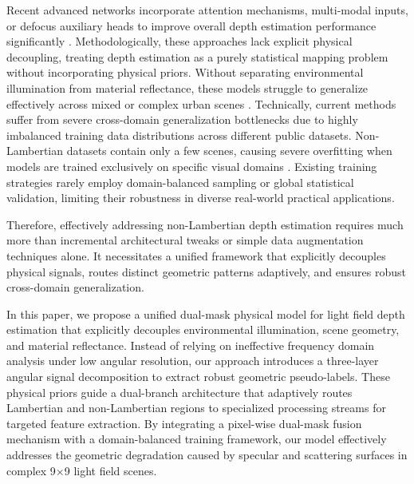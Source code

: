 \documentclass[lettersize,journal]{IEEEtran}
\begin{document}
Recent advanced networks incorporate attention mechanisms, multi-modal inputs, or defocus auxiliary heads to improve overall depth estimation performance significantly \cite{attentionatten}. Methodologically, these approaches lack explicit physical decoupling, treating depth estimation as a purely statistical mapping problem without incorporating physical priors. Without separating environmental illumination from material reflectance, these models struggle to generalize effectively across mixed or complex urban scenes \cite{mixedmixed}. Technically, current methods suffer from severe cross-domain generalization bottlenecks due to highly imbalanced training data distributions across different public datasets. Non-Lambertian datasets contain only a few scenes, causing severe overfitting when models are trained exclusively on specific visual domains \cite{datadata}. Existing training strategies rarely employ domain-balanced sampling or global statistical validation, limiting their robustness in diverse real-world practical applications.

Therefore, effectively addressing non-Lambertian depth estimation requires much more than incremental architectural tweaks or simple data augmentation techniques alone. It necessitates a unified framework that explicitly decouples physical signals, routes distinct geometric patterns adaptively, and ensures robust cross-domain generalization.

In this paper, we propose a unified dual-mask physical model for light field depth estimation that explicitly decouples environmental illumination, scene geometry, and material reflectance. Instead of relying on ineffective frequency domain analysis under low angular resolution, our approach introduces a three-layer angular signal decomposition to extract robust geometric pseudo-labels. These physical priors guide a dual-branch architecture that adaptively routes Lambertian and non-Lambertian regions to specialized processing streams for targeted feature extraction. By integrating a pixel-wise dual-mask fusion mechanism with a domain-balanced training framework, our model effectively addresses the geometric degradation caused by specular and scattering surfaces in complex 9×9 light field scenes.
\end{document}
